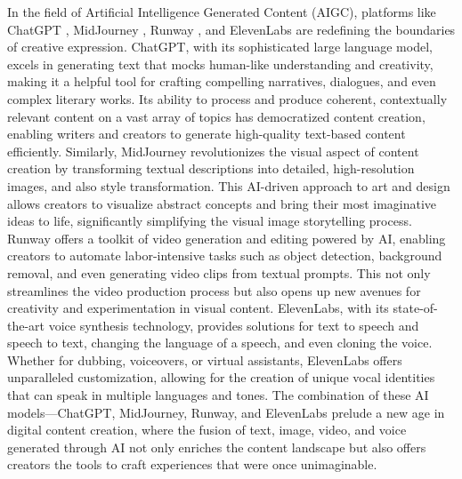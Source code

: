 \documentclass[11pt,a4paper,oneside]{report}
\begin{document}
In the field of Artificial Intelligence Generated Content (AIGC), platforms like ChatGPT \cite{leiter2023chatgpt} \cite{openai2023gpt}, MidJourney \cite{MidjourneyExplore}, Runway \cite{runwayml}, and ElevenLabs \cite{elevenlabs} are redefining the boundaries of creative expression. 
ChatGPT, with its sophisticated large language model, excels in generating text that mocks human-like understanding and creativity, making it a helpful tool for crafting compelling narratives, dialogues, and even complex literary works. 
Its ability to process and produce coherent, contextually relevant content on a vast array of topics has democratized content creation, enabling writers and creators to generate high-quality text-based content efficiently. 
Similarly, MidJourney revolutionizes the visual aspect of content creation by transforming textual descriptions into detailed, high-resolution images, and also style transformation.
This AI-driven approach to art and design allows creators to visualize abstract concepts and bring their most imaginative ideas to life, significantly simplifying the visual image storytelling process. 
Runway offers a toolkit of video generation and editing powered by AI, enabling creators to automate labor-intensive tasks such as object detection, background removal, and even generating video clips from textual prompts. 
This not only streamlines the video production process but also opens up new avenues for creativity and experimentation in visual content. 
ElevenLabs, with its state-of-the-art voice synthesis technology, provides solutions for text to speech and speech to text, changing the language of a speech, and even cloning the voice.
Whether for dubbing, voiceovers, or virtual assistants, ElevenLabs offers unparalleled customization, allowing for the creation of unique vocal identities that can speak in multiple languages and tones. 
The combination of these AI models—ChatGPT, MidJourney, Runway, and ElevenLabs prelude a new age in digital content creation, where the fusion of text, image, video, and voice generated through AI not only enriches the content landscape but also offers creators the tools to craft experiences that were once unimaginable.
\end{document}
